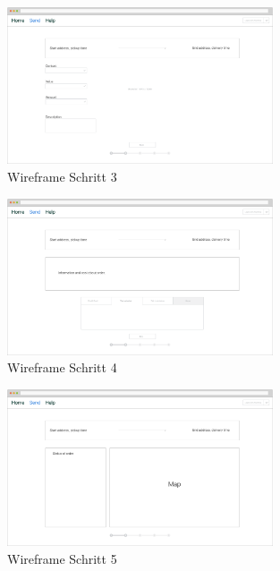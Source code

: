 \begin{figure}[ht]
  \centering
  \includegraphics[angle=270,width=0.7\textwidth]{images/step3.png}
  \caption{Wireframe Schritt 3}
  \label{fig:wireframes3}
\end{figure}

\begin{figure}[ht]
  \centering
  \includegraphics[angle=270,width=0.7\textwidth]{images/step4.png}
  \caption{Wireframe Schritt 4}
  \label{fig:wireframes4}
\end{figure}

\begin{figure}[ht]
  \centering
  \includegraphics[angle=270,width=0.7\textwidth]{images/step5.png}
  \caption{Wireframe Schritt 5}
  \label{fig:wireframes5}
\end{figure}

